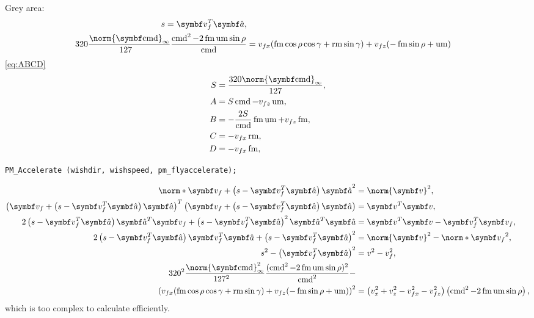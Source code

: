 Grey area:
\begin{align*}
s = \vec{v}_f^T \uvec{a},\\
320\frac{\norm{\vec{\cmd}}_{\infty}}{127\hphantom{_{\infty}}} \frac{\cmd^2  - 2\fmove\umove\sin\rho}{\cmd} &= v_{fx}(\fmove \cos\rho\cos\gamma + \rmove \sin\gamma) + v_{fz}(-\fmove \sin\rho + \umove)
\end{align*}
\eqref{eq:ABCD}
\begin{align*}
S &= \frac{320\norm{\vec{\cmd}}_{\infty}}{127},\\
A &= S\cmd         - v_{fz}\umove,\\
B &= -\frac{2S}{\cmd}\fmove\umove + v_{fz}\fmove,\\
C &= -v_{fx}\rmove,\\
D &= -v_{fx}\fmove,
\end{align*}

\texttt{PM\_Accelerate (wishdir, wishspeed, pm\_flyaccelerate);}

\begin{align*}
\norm*{\vec{v}_f + \left(s - \vec{v}_f^T \uvec{a} \right)\uvec{a}}^2 &= \norm{\vec{v}}^2,\\
\left(\vec{v}_f + \left(s - \vec{v}_f^T \uvec{a} \right)\uvec{a} \right)^T \left(\vec{v}_f + \left(s - \vec{v}_f^T \uvec{a} \right)\uvec{a} \right) &= \vec{v}^T \vec{v},\\
2\left(s - \vec{v}_f^T \uvec{a} \right)\uvec{a}^T \vec{v}_f + \left(s - \vec{v}_f^T \uvec{a} \right)^2\uvec{a}^T\uvec{a} &= \vec{v}^T \vec{v} - \vec{v}_f^T \vec{v}_f,\\
2\left(s - \vec{v}_f^T \uvec{a} \right)\vec{v}_f^T \uvec{a} + \left(s - \vec{v}_f^T \uvec{a} \right)^2 &= \norm{\vec{v}}^2 - \norm*{\vec{v}_f}^2,\\
s^2 - \left(\vec{v}_f^T \uvec{a}\right)^2 &= v^2 - v_f^2,\\
320^2\frac{\norm{\vec{\cmd}}_{\infty}^2}{127^2\hphantom{_{\infty}}} \frac{(\cmd^2  - 2\fmove\umove\sin\rho)^2}{\cmd^2} -\\ \left(v_{fx}(\fmove \cos\rho\cos\gamma + \rmove \sin\gamma) + v_{fz}(-\fmove \sin\rho + \umove) \right)^2 &= \left(v_x^2 + v_z^2 - v_{fx}^2 - v_{fz}^2 \right) \left(\cmd^2  - 2\fmove\umove\sin\rho \right),
\end{align*}
which is too complex to calculate efficiently.

